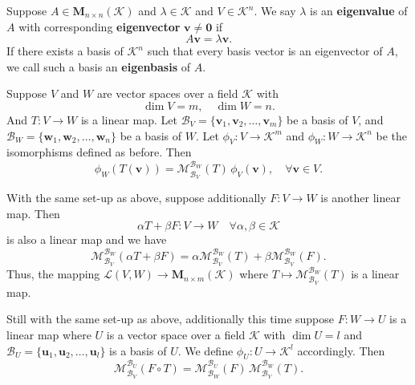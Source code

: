 	\begin{definitionenv}\label{def:eigenvalue}
		Suppose $A \in \bm{M}_{n\times n}(\mathcal{K})$ and	$\lambda \in \mathcal{K}$ and $V \in \mathcal{K}^n$. We say $\lambda$ is an \textbf{eigenvalue} of $A$ with	corresponding \textbf{eigenvector} $\bm{v} \neq \bm{0}$ if
		\[
		A\bm{v} = \lambda \bm{v}.
		\]
		If there exists a basis of $\mathcal{K}^n$ such that every basis vector is an eigenvector of $A$, we call such a basis an \textbf{eigenbasis} of $A$.
	\end{definitionenv}
	\begin{theoremenv}
		Suppose $V$ and $W$ are vector spaces over a field $\mathcal{K}$ with
		\[
		\dim V = m, \quad \dim W = n.
		\]
		And $T: V \to W$ is a linear map. Let $\mathcal{B}_V = \{\bm{v}_1, \bm{v}_2, \dots, \bm{v}_m\}$ be a basis of $V$, and $\mathcal{B}_W = \{\bm{w}_1, \bm{w}_2, \dots, \bm{w}_n\}$ be a basis of $W$. Let $\phi_V: V \to \mathcal{K}^m$ and $\phi_W: W \to \mathcal{K}^n$ be the isomorphisms defined as before. Then
		\[
		\phi_W (T(\bm{v})) = \mathcal{M}^{\mathcal{B}_W}_{\mathcal{B}_V}(T) \, \phi_V(\bm{v}), \quad \forall \bm{v} \in V.
		\]
	\end{theoremenv}
	\begin{theoremenv}
		With the same set-up as above, suppose additionally $F:V \to W$ is another linear map. Then
		\[
		\alpha T + \beta F: V \to W \quad \forall \alpha, \beta \in \mathcal{K}
		\]
		is also a linear map and we have
		\[
		\mathcal{M}^{\mathcal{B}_W}_{\mathcal{B}_V}(\alpha T + \beta F) = \alpha \mathcal{M}^{\mathcal{B}_W}_{\mathcal{B}_V}(T) + \beta \mathcal{M}^{\mathcal{B}_W}_{\mathcal{B}_V}(F).
		\]
		Thus, the mapping $\mathcal{L}(V,W)\to \bm{M}_{n \times m}(\mathcal{K})$ where $T \mapsto \mathcal{M}^{\mathcal{B}_W}_{\mathcal{B}_V}(T)$ is a linear map.
	\end{theoremenv}
	\begin{theoremenv}
		Still with the same set-up as above, additionally this time suppose $F:W \to U$ is a linear map where $U$ is a vector space over a field $\mathcal{K}$ with $\dim U = l$ and $\mathcal{B}_U = \{\bm{u}_1, \bm{u}_2, \dots, \bm{u}_l\}$ is a basis of $U$. We define $\phi_U: U \to \mathcal{K}^l$ accordingly. Then
		\[
		\mathcal{M}^{\mathcal{B}_U}_{\mathcal{B}_V}(F \circ T) = \mathcal{M}^{\mathcal{B}_U}_{\mathcal{B}_W}(F) \, \mathcal{M}^{\mathcal{B}_W}_{\mathcal{B}_V}(T).
		\]
	\end{theoremenv}
